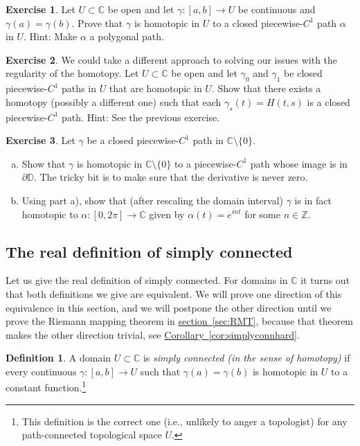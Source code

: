 \documentclass[12pt,openany]{book}
\newcommand{\C}{{\mathbb{C}}}
\newcommand{\Z}{{\mathbb{Z}}}
\newcommand{\D}{{\mathbb{D}}}
\theoremstyle{plain}
\theoremstyle{remark}
\theoremstyle{definition}
\newtheorem{defn}[thm]{Definition}
\newenvironment{exbox}{%
    \def\FrameCommand{\vrule width 1pt \relax\hspace{10pt}}%
    \MakeFramed{\advance\hsize-\width\FrameRestore}%
}{%
    \endMakeFramed
}
\newenvironment{exparts}{%
    \leavevmode\begin{enumerate}[a),noitemsep,topsep=0pt,parsep=0pt,partopsep=0pt]
}{%
    \end{enumerate}
}
\theoremstyle{exercise}
\newtheorem{exercise}{Exercise}[section]
\theoremstyle{example}
\newcommand{\sectionref}[1]{\hyperref[#1]{section~\ref*{#1}}}
\newcommand{\corref}[1]{\hyperref[#1]{Corollary~\ref*{#1}}}
\begin{document}
\begin{exbox}
\begin{exercise}
Let $U \subset \C$ be open and let $\gamma \colon [a,b] \to U$ be continuous
and $\gamma(a)=\gamma(b)$.  Prove that $\gamma$ is homotopic in $U$
to a closed piecewise-$C^1$ path $\alpha$ in $U$.
Hint: Make $\alpha$ a polygonal path.
\end{exercise}

\begin{exercise}
We could take a different approach to solving our issues with the regularity
of the homotopy.  Let
$U \subset \C$ be open and let $\gamma_0$ and $\gamma_1$ be closed
piecewise-$C^1$ paths in $U$ that are homotopic in $U$.
Show that there exists a homotopy (possibly a different one) such that
each $\gamma_s(t) = H(t,s)$ is a closed piecewise-$C^1$ path.
Hint: See the previous exercise.
\end{exercise}

\begin{exercise}
\pagebreak[2]
Let $\gamma$ be a closed piecewise-$C^1$ path in $\C \setminus \{ 0 \}$.
\begin{exparts}
\item
Show that $\gamma$ is homotopic in $\C \setminus \{ 0 \}$ to
a piecewise-$C^1$ path whose image is in $\partial \D$.
The tricky bit is to make sure that the derivative is never zero.
\item
Using part a),
show that (after rescaling the domain interval) $\gamma$ is in fact homotopic to
$\alpha \colon [0,2\pi] \to \C$ given by $\alpha(t) = e^{int}$ for some
$n \in \Z$.
\end{exparts}
\end{exercise}
\end{exbox}

\subsection{The real definition of simply connected}

Let us give the real definition of simply connected.
For domains in $\C$ it
turns out that both definitions we give are equivalent.
We will prove one direction of this equivalence in this section,
and we will postpone the other direction until we prove the Riemann
mapping theorem in \sectionref{sec:RMT},
because that theorem makes the other direction trivial, see
\corref{cor:simplyconnhard}.

\begin{defn}
A domain $U \subset \C$ is
\emph{simply connected (in the sense of homotopy)}%
if every continuous $\gamma \colon [a,b] \to U$ such that $\gamma(a) =
\gamma(b)$ is homotopic in $U$ to a constant function.\footnote{%
This definition is the correct one (i.e., unlikely to anger a topologist)
for any path-connected topological space $U$.}
\end{defn}
\end{document}
